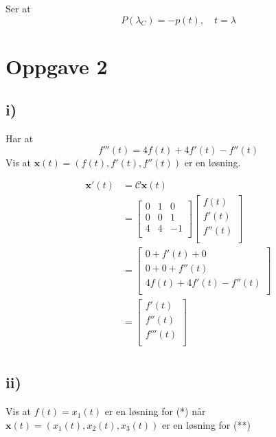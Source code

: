 \documentclass[a4paper, norsk, twoside, 10pt]{article}
\begin{document}
\begin{flushleft}
  Ser at \[P(\lambda_{C}) = -p(t), \quad t = \lambda\]


  \newpage

  \section*{Oppgave 2}

  \subsection*{i)}
  Har at\[f'''(t) = 4f(t) + 4f'(t)- f''(t)\]
  Vis at $\mathbf{x}(t) = (f(t), f'(t), f''(t))$ er en løsning.
  
  \begin{align*}
    \mathbf{x}'(t) &= \mathcal{C}\mathbf{x}(t) \\
    &= \begin{bmatrix}
      0 & 1 & 0 \\
      0 & 0 & 1 \\
      4 & 4 & -1 \\
    \end{bmatrix}
    \begin{bmatrix}
      f(t) \\
      f'(t) \\
      f''(t) \\
    \end{bmatrix}
    \\
    &= \begin{bmatrix}
      0 + f'(t) + 0 \\
      0 + 0 + f''(t) \\
      4f(t) + 4f'(t) -f''(t) \\
    \end{bmatrix} \\
    &= \begin{bmatrix}
      f'(t) \\
      f''(t) \\
      f'''(t)\\
    \end{bmatrix} \\
  \end{align*}

  \subsection*{ii)}

  Vis at $f(t) = x_{1}(t)$ er en løsning for (*) når $\mathbf{x}(t) = (x_{1}(t), x_{2}(t) , x_{3}(t))$ er en løsning for (**) \\


\end{flushleft}
\end{document}
